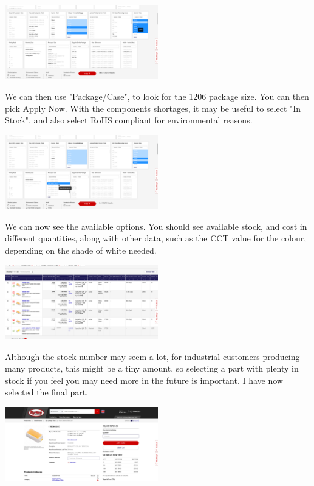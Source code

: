 \documentclass[a4paper,11pt]{report}
\begin{document}
\includegraphics[width=0.5\textwidth]{screenshots/DigiKeyWhiteLEDPageCurrent}

We can then use "Package/Case", to look for the 1206 package size. You can then pick Apply Now. With the components shortages, it may be useful to select "In Stock", and also select RoHS compliant for environmental reasons.

\includegraphics[width=0.5\textwidth]{screenshots/DigiKeyWhiteLEDPagePackage}

We can now see the available options. You should see available stock, and cost in different quantities, along with other data, such as the CCT value for the colour, depending on the shade of white needed.

\includegraphics[width=0.5\textwidth]{screenshots/DigiKeyWhiteLEDPageOptions}

Although the stock number may seem a lot, for industrial customers producing many products, this might be a tiny amount, so selecting a part with plenty in stock if you feel you may need more in the future is important. I have now selected the final part.

\includegraphics[width=0.5\textwidth]{screenshots/DigiKeyWhiteLEDFinalPart}
\end{document}
